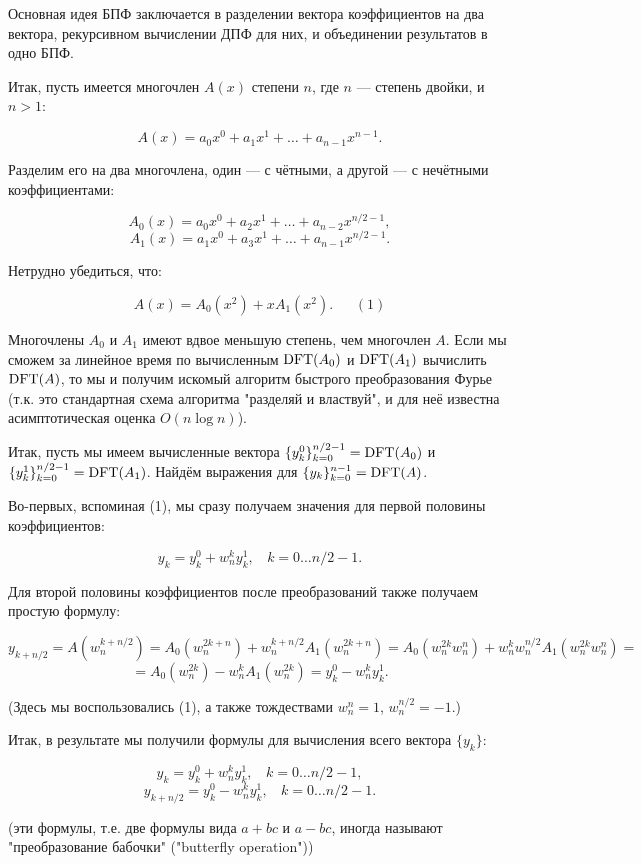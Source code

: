 Основная идея БПФ заключается в разделении вектора коэффициентов на два вектора, рекурсивном вычислении ДПФ для них, и объединении результатов в одно БПФ.

Итак, пусть имеется многочлен $A(x)$ степени $n$, где $n$ --- степень двойки, и $n>1$:

$$ A(x) = a_0 x^0 + a_1 x^1 + \ldots + a_{n-1} x^{n-1}. $$

Разделим его на два многочлена, один --- с чётными, а другой --- с нечётными коэффициентами:

$$ A_0(x) = a_0 x^0 + a_2 x^1 + \ldots + a_{n-2} x^{n/2-1}, $$
$$ A_1(x) = a_1 x^0 + a_3 x^1 + \ldots + a_{n-1} x^{n/2-1}. $$

Нетрудно убедиться, что:

$$ A(x) = A_0(x^2) + x A_1(x^2). ~~~~~~~(1) $$

Многочлены $A_0$ и $A_1$ имеют вдвое меньшую степень, чем многочлен $A$. Если мы сможем за линейное время по вычисленным ${\rm DFT}(A_0)$ и ${\rm DFT}(A_1)$ вычислить ${\rm DFT}(A)$, то мы и получим искомый алгоритм быстрого преобразования Фурье (т.к. это стандартная схема алгоритма "разделяй и властвуй", и для неё известна асимптотическая оценка $O(n \log n)$).

Итак, пусть мы имеем вычисленные вектора $\{ y_k^0 \}_{k=0}^{n/2-1} = {\rm DFT}(A_0)$ и $\{ y_k^1 \}_{k=0}^{n/2-1} = {\rm DFT}(A_1)$. Найдём выражения для $\{ y_k \}_{k=0}^{n-1} = {\rm DFT}(A)$.

Во-первых, вспоминая (1), мы сразу получаем значения для первой половины коэффициентов:

$$ y_k = y_k^0 + w_n^k y_k^1, ~~~~k = 0 \ldots n/2-1. $$

Для второй половины коэффициентов после преобразований также получаем простую формулу:

$$ y_{k+n/2} = A(w_n^{k+n/2}) = A_0(w_n^{2k+n}) + w_n^{k+n/2} A_1(w_n^{2k+n}) = A_0(w_n^{2k} w_n^n) + w_n^k w_n^{n/2} A_1(w_n^{2k} w_n^n) = $$
$$ = A_0(w_n^{2k}) - w_n^k A_1(w_n^{2k}) = y_k^0 - w_n^k y_k^1. $$

(Здесь мы воспользовались (1), а также тождествами $w_n^n = 1$, $w_n^{n/2} = -1$.)

Итак, в результате мы получили формулы для вычисления всего вектора $\{ y_k \}$:

$$ y_k = y_k^0 + w_n^k y_k^1, \ \ \ \ k = 0 \ldots n/2-1, $$
$$ y_{k+n/2} = y_k^0 - w_n^k y_k^1, \ \ \ \ k = 0 \ldots n/2-1. $$

(эти формулы, т.е. две формулы вида $a+bc$ и $a-bc$, иногда называют "преобразование бабочки" ("butterfly operation"))

